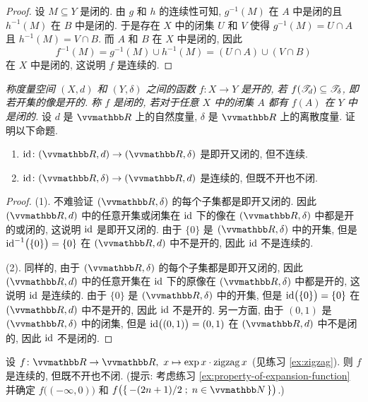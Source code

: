 \begin{proof}
    设 \(M \subseteq Y\) 是闭的. 由 \(g\) 和 \(h\) 的连续性可知, \(g^{- 1}(M)\) 在 \(A\) 中是闭的且 \(h^{- 1}(M)\) 在 \(B\) 中是闭的. 于是存在 \(X\) 中的闭集 \(U\) 和 \(V\) 使得 \(g^{- 1}(M) = U \cap A\) 且 \(h^{- 1}(M) = V \cap B\). 而 \(A\) 和 \(B\) 在 \(X\) 中是闭的, 因此
    \[
        f^{- 1}(M) = g^{- 1}(M) \cup h^{- 1}(M) = (U \cap A) \cup (V \cap B)
    \]
    在 \(X\) 中是闭的, 这说明 \(f\) 是连续的.
\end{proof}

\begin{exercise}
    \textsl{称度量空间 \((X, d)\) 和 \((Y, \delta)\) 之间的函数 \(f \colon X \to Y\) 是开的, 若 \(f(\mathscr T_d) \subseteq \mathscr T_\delta\), 即若开集的像是开的. 称 \(f\) 是闭的, 若对于任意 \(X\) 中的闭集 \(A\) 都有 \(f(A)\) 在 \(Y\) 中是闭的.} 设 \(d\) 是 \(\R\) 上的自然度量, \(\delta\) 是 \(\R\) 上的离散度量. 证明以下命题.
    \begin{enumerate}
        \item \(\id \colon (\R, d) \to (\R, \delta)\) 是即开又闭的, 但不连续.
        \item \(\id \colon (\R, \delta) \to (\R, d)\) 是连续的, 但既不开也不闭.
    \end{enumerate}
\end{exercise}

\begin{proof}
    (1). 不难验证 \((\R, \delta)\) 的每个子集都是即开又闭的. 因此 \((\R, d)\) 中的任意开集或闭集在 \(\operatorname{id}\) 下的像在 \((\R, \delta)\) 中都是开的或闭的, 这说明 \(\operatorname{id}\) 是即开又闭的. 由于 \(\{0\}\) 是 \((\R, \delta)\) 中的开集, 但是 \(\operatorname{id}^{- 1}\bigl(\{0\}\bigr) = \{0\}\) 在 \((\R, d)\) 中不是开的, 因此 \(\operatorname{id}\) 不是连续的.

    (2). 同样的, 由于 \((\R, \delta)\) 的每个子集都是即开又闭的, 因此 \((\R, d)\) 中的任意开集在 \(\operatorname{id}\) 下的原像在 \((\R, \delta)\) 中都是开的, 这说明 \(\operatorname{id}\) 是连续的. 由于 \(\{0\}\) 是 \((\R, \delta)\) 中的开集, 但是 \(\operatorname{id}\bigl(\{0\}\bigr) = \{0\}\) 在 \((\R, d)\) 中不是开的, 因此 \(\operatorname{id}\) 不是开的. 另一方面, 由于 \((0, 1)\) 是 \((\R, \delta)\) 中的闭集, 但是 \(\operatorname{id}\bigl((0, 1)\bigr) = (0, 1)\) 在 \((\R, d)\) 中不是闭的, 因此 \(\operatorname{id}\) 不是闭的.
\end{proof}

\begin{exercise}
    设 \(f \colon \R \to \R,\ x \mapsto \exp x \cdot \zigzag x\) (见练习 \ref{ex:zigzag}). 则 \(f\) 是连续的, 但既不开也不闭. (提示: 考虑练习 \ref{ex:property-of-expansion-function} 并确定 \(f\bigl((- \infty, 0)\bigr)\) 和 \(f \bigl(\{\, - (2 n + 1) / 2 \;;\; n \in \N \,\}\bigr)\).)
\end{exercise}

